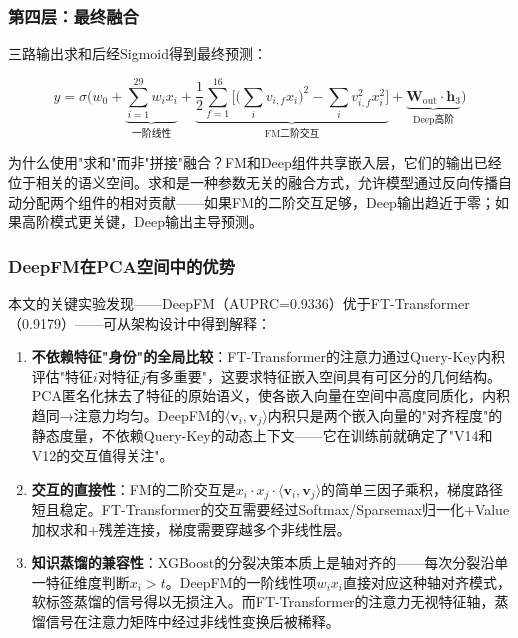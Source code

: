 \subsubsection{第四层：最终融合}

三路输出求和后经Sigmoid得到最终预测：

\begin{equation}
\hat{y} = \sigma\Big(w_0 + \underbrace{\sum_{i=1}^{29} w_i x_i}_{\text{一阶线性}} + \underbrace{\frac{1}{2}\sum_{f=1}^{16}\Big[\big(\sum_i v_{i,f}x_i\big)^2 - \sum_i v_{i,f}^2 x_i^2\Big]}_{\text{FM二阶交互}} + \underbrace{\mathbf{W}_{\mathrm{out}} \cdot \mathbf{h}_3}_{\text{Deep高阶}} \Big)
\end{equation}

为什么使用"求和"而非"拼接"融合？FM和Deep组件共享嵌入层，它们的输出已经位于相关的语义空间。求和是一种参数无关的融合方式，允许模型通过反向传播自动分配两个组件的相对贡献——如果FM的二阶交互足够，Deep输出趋近于零；如果高阶模式更关键，Deep输出主导预测。

\subsubsection{DeepFM在PCA空间中的优势}

本文的关键实验发现——DeepFM（AUPRC=0.9336）优于FT-Transformer（0.9179）——可从架构设计中得到解释：

\begin{enumerate}
    \item \textbf{不依赖特征"身份"的全局比较}：FT-Transformer的注意力通过Query-Key内积评估"特征$i$对特征$j$有多重要"，这要求特征嵌入空间具有可区分的几何结构。PCA匿名化抹去了特征的原始语义，使各嵌入向量在空间中高度同质化，内积趋同→注意力均匀。DeepFM的$\langle \mathbf{v}_i, \mathbf{v}_j \rangle$内积只是两个嵌入向量的"对齐程度"的静态度量，不依赖Query-Key的动态上下文——它在训练前就确定了"V14和V12的交互值得关注"。
    \item \textbf{交互的直接性}：FM的二阶交互是$x_i \cdot x_j \cdot \langle \mathbf{v}_i, \mathbf{v}_j \rangle$的简单三因子乘积，梯度路径短且稳定。FT-Transformer的交互需要经过Softmax/Sparsemax归一化+Value加权求和+残差连接，梯度需要穿越多个非线性层。
    \item \textbf{知识蒸馏的兼容性}：XGBoost的分裂决策本质上是轴对齐的——每次分裂沿单一特征维度判断$x_i > t$。DeepFM的一阶线性项$w_i x_i$直接对应这种轴对齐模式，软标签蒸馏的信号得以无损注入。而FT-Transformer的注意力无视特征轴，蒸馏信号在注意力矩阵中经过非线性变换后被稀释。
\end{enumerate}

